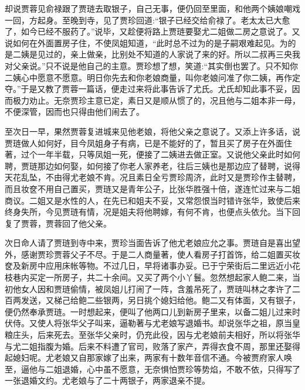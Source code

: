 \begin{parag}
    却说贾蓉见俞禄跟了贾琏去取银子，自己无事，便仍回至里面，和他两个姨娘嘲戏一回，方起身。至晚到寺，见了贾珍回道:“银子已经交给俞禄了。老太太已大愈了，如今已经不服药了。”说毕，又趁便将路上贾琏要娶尤二姐做二房之意说了。又说如何在外面置房子住，不使凤姐知道，“此时总不过为的是子嗣艰难起见。为的是二姨是见过的，亲上做亲，比别处不知道的人家说了来的好。所以二叔再三央我对父亲说。”只不说是他自己的主意。贾珍想了想，笑道:“其实倒也罢了。只不知你二姨心中愿意不愿意。明日你先去和你老娘商量，叫你老娘问准了你二姨，再作定夺。”于是又教了贾蓉一篇话，便走过来将此事告诉了尤氏。尤氏却知此事不妥，因而极力劝止。无奈贾珍主意已定，素日又是顺从惯了的，况且他与二姐本非一母，不便深管，因而也只得由他们闹去了。
\end{parag}


\begin{parag}
    至次日一早，果然贾蓉复进城来见他老娘，将他父亲之意说了。又添上许多话，说贾琏做人如何好，目今凤姐身子有病，已是不能好的了，暂且买了房子在外面住著，过个一年半载，只等凤姐一死，便接了二姨进去做正室。又说他父亲此时如何聘，贾琏那边如何娶，如何接了你老人家养老，往后三姨也是那边应了替聘，说得天花乱坠，不由得尤老娘不肯。况且素日全亏贾珍周济，此时又是贾珍作主替聘，而且妆奁不用自己置买，贾琏又是青年公子，比张华胜强十倍，遂连忙过来与二姐商议。二姐又是水性的人，在先已和姐夫不妥，又常怨恨当时错许张华，致使后来终身失所，今见贾琏有情，况是姐夫将他聘嫁，有何不肯，也便点头依允。当下回复了贾蓉，贾蓉回了他父亲。
\end{parag}


\begin{parag}
    次日命人请了贾琏到寺中来，贾珍当面告诉了他尤老娘应允之事。贾琏自是喜出望外，感谢贾珍贾蓉父子不尽。于是二人商量著，使人看房子打首饰，给二姐置买妆奁及新房中应用床帐等物。不过几日，早将诸事办妥。已于宁荣街后二里远近小花枝巷内买定一所房子，共二十余间。又买了两个小丫鬟。忽然想起家人鲍二来，当初他女人因和贾琏偷情，被凤姐儿打闹了一阵，含羞吊死了，贾琏叫林之孝许了二百两发送，又梯己给鲍二些银两，另日挑个媳妇给他。鲍二又有体面，又有银子，便仍然奉承贾琏。一时想起来，便叫了他两口儿到新房子里来，以备二姐儿过来时伏侍。又使人将张华父子叫来，逼勒著与尤老娘写退婚书。却说张华之祖，原当皇粮庄头，后来死去。至张华父亲时，仍充此役，因与尤老娘前夫相好，所以将张华与尤二姐指腹为婚。后来不料遭了官司，败落了家产，弄得衣食不周，那里还娶得起媳妇呢。尤老娘又自那家嫁了出来，两家有十数年音信不通。今被贾府家人唤至，逼他与二姐退婚，心中虽不愿意，无奈惧怕贾珍等势焰，不敢不依，只得写了一张退婚文约。尤老娘与了二十两银子，两家退亲不提。
\end{parag}



